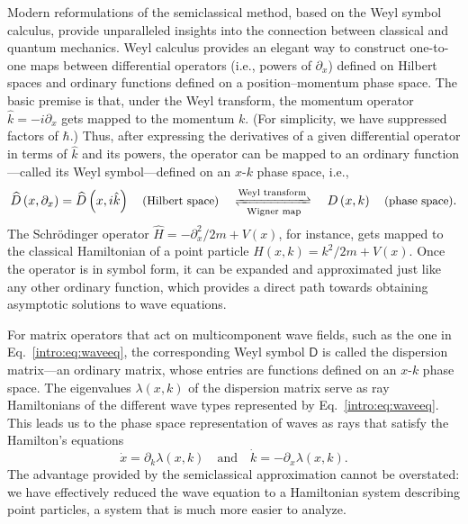 Modern reformulations of the semiclassical method, based on the Weyl symbol calculus, provide unparalleled insights into the connection between classical and quantum mechanics.
Weyl calculus provides an elegant way to construct one-to-one maps between differential operators (i.e., powers of $\partial_{x}$) defined on Hilbert spaces and ordinary functions defined on a position--momentum phase space.
The basic premise is that, under the Weyl transform, the momentum operator $\hat{k} = -i\partial_{x}$ gets mapped to the momentum $k$.
(For simplicity, we have suppressed factors of $\hbar$.)
Thus, after expressing the derivatives of a given differential operator in terms of $\hat{k}$ and its powers, the operator can be mapped to an ordinary function---called its Weyl symbol---defined on an $x$-$k$ phase space, i.e.,
%
\begin{equation}
  \widehat{D}\left(x, \partial_{x}\right) = \widehat{D}\left(x, i\hat{k}\right) \quad\text{\small(Hilbert space)} \quad\xrightleftharpoons[\text{Wigner map}]{\text{Weyl transform}}\quad D\left(x, k\right) \quad\text{\small(phase space)}.
\end{equation}
%
The Schr\"{o}dinger operator $\widehat{H} = -\partial_{x}^{2}/2m + V(x)$, for instance, gets mapped to the classical Hamiltonian of a point particle $H(x, k) = k^{2}/2m + V(x)$.
Once the operator is in symbol form, it can be expanded and approximated just like any other ordinary function, which provides a direct path towards obtaining asymptotic solutions to wave equations.

For matrix operators that act on multicomponent wave fields, such as the one in Eq.~\eqref{intro:eq:waveeq}, the corresponding Weyl symbol $\mathsf{D}$ is called the dispersion matrix---an ordinary matrix, whose entries are functions defined on an $x$-$k$ phase space.
The eigenvalues $\lambda(x, k)$ of the dispersion matrix serve as ray Hamiltonians of the different wave types represented by Eq.~\eqref{intro:eq:waveeq}.
This leads us to the phase space representation of waves as rays that satisfy the Hamilton's equations
%
\begin{equation}
\dot{x} = \partial_{k}\lambda(x,k)
\quad\text{and}\quad
\dot{k} = -\partial_{x}\lambda(x, k).
\end{equation}
%
The advantage provided by the semiclassical approximation cannot be overstated: we have effectively reduced the wave equation to a Hamiltonian system describing point particles, a system that is much more easier to analyze.

